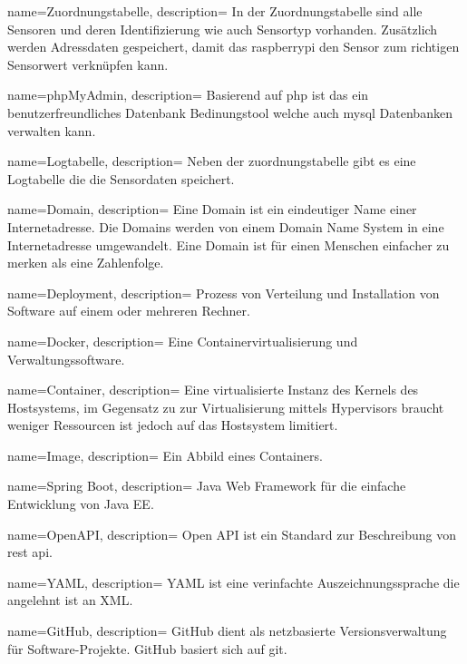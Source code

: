 {
	name=Zuordnungstabelle,
	description={
		In der Zuordnungstabelle sind alle Sensoren und deren Identifizierung wie auch Sensortyp vorhanden. Zusätzlich werden Adressdaten gespeichert, damit das \gls{raspberrypi} den Sensor zum richtigen Sensorwert verknüpfen kann.
	}
}

{
	name=phpMyAdmin,
	description={
		Basierend auf \gls{php} ist das ein benutzerfreundliches Datenbank Bedinungstool welche auch \gls{mysql} Datenbanken verwalten kann.\cite{phpMyAdmin}
	}
}

{
	name=Logtabelle,
	description={
		Neben der \gls{zuordnungstabelle} gibt es eine Logtabelle die die Sensordaten speichert.
	}
}

{
	name=Domain,
	description={
		Eine Domain ist ein eindeutiger Name einer Internetadresse. Die Domains werden von einem Domain Name System in eine Internetadresse umgewandelt. Eine Domain ist für einen Menschen einfacher zu merken als eine Zahlenfolge.\cite{domain}
	}
}

{
	name=Deployment,
	description={
		Prozess von Verteilung und Installation von Software auf einem oder mehreren Rechner.\cite{Deployment}
	}
}

{
	name=Docker,
	description={
		Eine Containervirtualisierung und Verwaltungssoftware.\cite{Docker}
	}
}

{
	name=Container,
	description={
		Eine virtualisierte Instanz des Kernels des Hostsystems, im Gegensatz zu zur Virtualisierung mittels Hypervisors braucht weniger Ressourcen ist jedoch auf das Hostsystem limitiert.\cite{Container}
	}
}

{
	name=Image,
	description={
		Ein Abbild eines Containers.\cite{Image}
	}
}

{
	name=Spring Boot,
	description={
		Java Web Framework für die einfache Entwicklung von Java EE.\cite{SpringBoot}
	}
}

{
	name=OpenAPI,
	description={
		Open API ist ein Standard zur Beschreibung von \gls{rest} \gls{api}.\cite{OpenAPI}
	}
}

{
	name=YAML,
	description={
		YAML ist eine verinfachte Auszeichnungssprache die angelehnt ist an XML.\cite{YAML}
	}
}

{
	name=GitHub,
	description={
		GitHub dient als netzbasierte Versionsverwaltung für Software-Projekte. GitHub basiert sich auf \gls{git}.\cite{github}
	}
}

